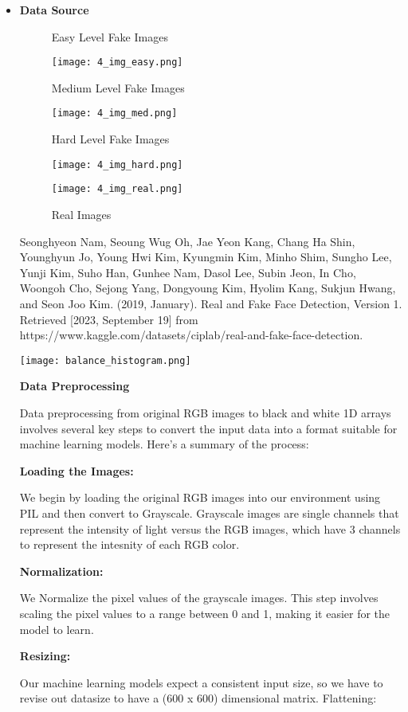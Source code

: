 \documentclass{article}
\begin{document}
\begin{titlepage}
\begin{itemize}
            \item[] \textbf{Data Source}

\begin{figure}[H]
\caption{Easy Level Fake Images}
\centering
\texttt{[image: 4\_img\_easy.png]}
\caption{Medium Level Fake Images}
\centering
\texttt{[image: 4\_img\_med.png]}
\caption{Hard Level Fake Images}
\centering
\texttt{[image: 4\_img\_hard.png]}
\caption{Real Images}
\centering
\texttt{[image: 4\_img\_real.png]}
\end{figure}

            Seonghyeon Nam, Seoung Wug Oh, Jae Yeon Kang, Chang Ha Shin, Younghyun Jo, Young Hwi Kim, Kyungmin Kim, Minho Shim, Sungho Lee, Yunji Kim, Suho Han, Gunhee Nam, Dasol Lee, Subin Jeon, In Cho, Woongoh Cho, Sejong Yang, Dongyoung Kim, Hyolim Kang, Sukjun Hwang, and Seon Joo Kim. (2019, January). Real and Fake Face Detection, Version 1. Retrieved [2023, September 19] from https://www.kaggle.com/datasets/ciplab/real-and-fake-face-detection.

\begin{center}
\texttt{[image: balance\_histogram.png]}
\end{center}

\newpage

    \textbf{Data Preprocessing}




Data preprocessing from original RGB images to black and white 1D arrays involves several key steps to convert the input data into a format suitable for machine learning models. Here's a summary of the process:

\textbf{Loading the Images:}

We begin by loading the original RGB images into our environment using PIL and then convert to Grayscale. Grayscale images are single channels that represent the intensity of light versus the RGB images, which have 3 channels to represent the intesnity of each RGB color.


\textbf{Normalization:}

We Normalize the pixel values of the grayscale images. This step involves scaling the pixel values to a range between 0 and 1, making it easier for the model to learn.

\textbf{Resizing:}

Our machine learning models expect a consistent input size, so we have to revise out datasize to have a ($600$ x $600$) dimensional matrix.
Flattening:


\end{itemize}
\end{titlepage}
\end{document}
